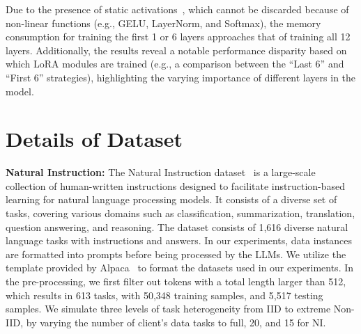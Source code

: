 \documentclass[sigconf]{acmart}
\newcommand*\circled[1]{\tikz[baseline=(char.base)]{
            \node[shape=circle,draw,inner sep=0.4pt] (char) {#1};}}
\begin{document}
    Due to the presence of static activations~\cite{ardakani2024slimfit}, which cannot be discarded because of non-linear functions (e.g., GELU, LayerNorm, and Softmax), the memory consumption for training the first 1 or 6 layers approaches that of training all 12 layers. Additionally, the results reveal a notable performance disparity based on which LoRA modules are trained (e.g., a comparison between the ``Last 6'' and ``First 6'' strategies), highlighting the varying importance of different layers in the model.
    
\section{Details of Dataset}\label{sec:appendix-dataset}

\circled{1} \textbf{Natural Instruction:}
The Natural Instruction dataset~\cite{wang2022super} is a large-scale collection of human-written instructions designed to facilitate instruction-based learning for natural language processing models. It consists of a diverse set of tasks, covering various domains such as classification, summarization, translation, question answering, and reasoning. The dataset consists of 1,616 diverse natural language tasks with instructions and answers. 
In our experiments, data instances are formatted into prompts before being processed by the LLMs. We utilize the template provided by Alpaca~\cite{taori2023stanford} to format the datasets used in our experiments.
In the pre-processing, we first filter out tokens with a total length larger than 512, which results in 613 tasks, with 50,348 training samples, and 5,517 testing samples. 
%
We simulate three levels of task heterogeneity from IID to extreme Non-IID, by varying the number of client's data tasks to full, 20, and 15 for NI.
\end{document}
